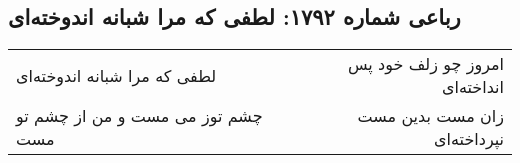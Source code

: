 \begin{center}
\section*{رباعی شماره ۱۷۹۲: لطفی که مرا شبانه اندوخته‌ای}
\label{sec:1792}
\begin{longtable}{l p{0.5cm} r}
لطفی که مرا شبانه اندوخته‌ای
&&
امروز چو زلف خود پس انداخته‌ای
\\
چشم توز می مست و من از چشم تو مست
&&
زان مست بدین مست نپرداخته‌ای
\\
\end{longtable}
\end{center}
